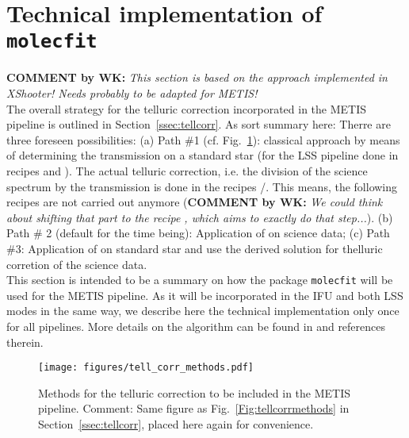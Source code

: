 \section{Technical implementation of \texttt{molecfit}}\label{app:mf}
\textbf{COMMENT by WK:} \textit{This section is based on the approach implemented in XShooter! Needs probably to be adapted for METIS!}\\[0.5cm]

The overall strategy for the telluric correction incorporated in the METIS pipeline is outlined in Section~\ref{ssec:tellcorr}. As sort summary here: Therre are three foreseen possibilities: (a) Path \#1 (cf. Fig.~\ref{Fig:tellcorrmethods2}): classical approach by means of determining the transmission on a standard star (for the LSS pipeline done in recipes  and ). The actual telluric correction, i.e. the division of the science spectrum by the transmission is done in the recipes /. This means, the following recipes are not carried out anymore (\textbf{COMMENT by WK:} \textit{We could think about shifting that part to the recipe , which aims to exactly do that step...}). (b) Path \# 2 (default for the time being): Application of \mf on science data; (c) Path \#3: Application of \mf on standard star and use the derived solution for thelluric corretion of the science data.\\
This section is intended to be a summary on how the package \texttt{molecfit} will be used for the \ac{METIS} pipeline. As it will be incorporated in the \ac{IFU} and both \ac{LSS} modes in the same way, we describe here the technical implementation only once for all pipelines. More details on the \mf algorithm can be found in \cite{molecfit} and references therein.
\begin{figure}[ht]
  \centering
  \texttt{[image: figures/tell\_corr\_methods.pdf]}
    \caption[Methods for the telluric correction to be included in the METIS pipeline]{%
        Methods for the telluric correction to be included in the \ac{METIS} pipeline. Comment: Same figure as Fig.~\ref{Fig:tellcorrmethods} in Section~\ref{ssec:tellcorr}, placed here again for convenience. }
  \label{Fig:tellcorrmethods2}
\end{figure}

